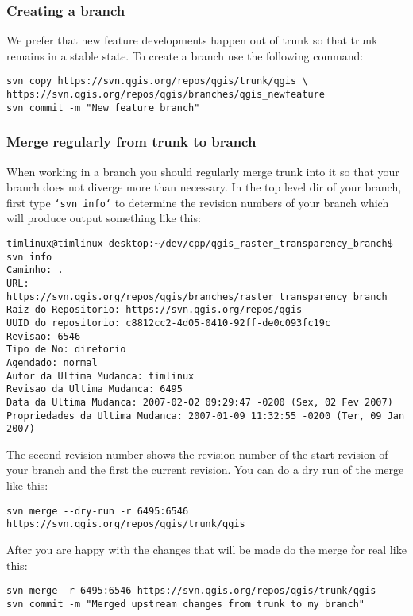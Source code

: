 \subsubsection{Creating a branch}
We prefer that new feature developments happen out of trunk so that trunk remains in a 
stable state. To create a branch use the following command:

\begin{verbatim}
svn copy https://svn.qgis.org/repos/qgis/trunk/qgis \
https://svn.qgis.org/repos/qgis/branches/qgis_newfeature
svn commit -m "New feature branch"
\end{verbatim}

\subsubsection{Merge regularly from trunk to branch}
When working in a branch you should regularly merge trunk into it so that your branch does not diverge more 
than necessary. In the top level dir of your branch, first type \texttt{`svn info`} to determine the revision 
numbers of your branch which will produce output something like this:

\begin{verbatim}
timlinux@timlinux-desktop:~/dev/cpp/qgis_raster_transparency_branch$ svn info
Caminho: .
URL: https://svn.qgis.org/repos/qgis/branches/raster_transparency_branch
Raiz do Repositorio: https://svn.qgis.org/repos/qgis
UUID do repositorio: c8812cc2-4d05-0410-92ff-de0c093fc19c
Revisao: 6546
Tipo de No: diretorio
Agendado: normal
Autor da Ultima Mudanca: timlinux
Revisao da Ultima Mudanca: 6495
Data da Ultima Mudanca: 2007-02-02 09:29:47 -0200 (Sex, 02 Fev 2007)
Propriedades da Ultima Mudanca: 2007-01-09 11:32:55 -0200 (Ter, 09 Jan 2007)
\end{verbatim}

The second revision number shows the revision number of the start revision of your branch and the first the 
current revision. You can do a dry run of the merge like this:

\begin{verbatim}
svn merge --dry-run -r 6495:6546 https://svn.qgis.org/repos/qgis/trunk/qgis
\end{verbatim}

After you are happy with the changes that will be made do the merge for real like this:

\begin{verbatim}
svn merge -r 6495:6546 https://svn.qgis.org/repos/qgis/trunk/qgis
svn commit -m "Merged upstream changes from trunk to my branch"
\end{verbatim}


